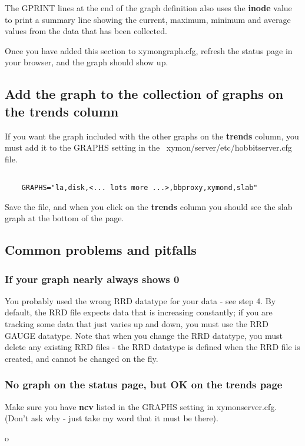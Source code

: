  The GPRINT lines at the end of the graph definition also uses the \textbf{inode}
 value to print a summary line showing the current, maximum, minimum and average values from the data that has been collected.


 Once you have added this section to xymongraph.cfg, refresh the status page in your browser, and the graph should show up.
\subsection{Add the graph to the collection of graphs on the trends column}


 If you want the graph included with the other graphs on the \textbf{trends}
 column, you must add it to the GRAPHS setting in the ~xymon/server/etc/hobbitserver.cfg file.
\begin{verbatim}

	GRAPHS="la,disk,<... lots more ...>,bbproxy,xymond,slab"

\end{verbatim}
 Save the file, and when you click on the \textbf{trends}
 column you should see the slab graph at the bottom of the page. \subsection{Common problems and pitfalls}
\subsubsection{If your graph nearly always shows 0}


 You probably used the wrong RRD datatype for your data - see step 4. By default, the RRD file expects data that is increasing constantly; if you are tracking some data that just varies up and down, you must use the RRD GAUGE datatype. Note that when you change the RRD datatype, you must delete any existing RRD files - the RRD datatype is defined when the RRD file is created, and cannot be changed on the fly.
\subsubsection{No graph on the status page, but OK on the trends page}


 Make sure you have \textbf{ncv}
 listed in the GRAPHS setting in xymonserver.cfg. (Don't ask why - just take my word that it must be there).

o
